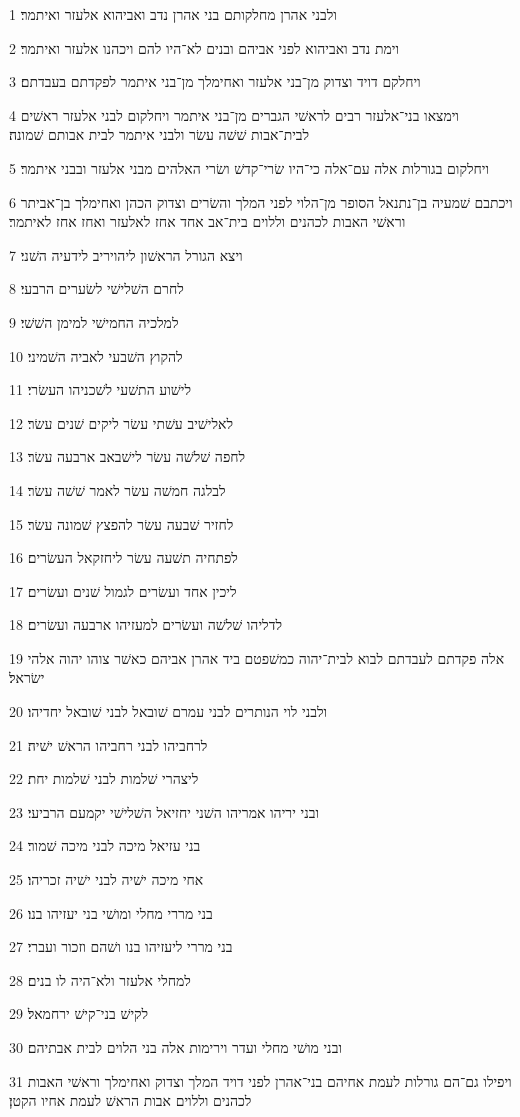 \par 1 ולבני אהרן מחלקותם בני אהרן נדב ואביהוא אלעזר ואיתמר׃
\par 2 וימת נדב ואביהוא לפני אביהם ובנים לא־היו להם ויכהנו אלעזר ואיתמר׃
\par 3 ויחלקם דויד וצדוק מן־בני אלעזר ואחימלך מן־בני איתמר לפקדתם בעבדתם׃
\par 4 וימצאו בני־אלעזר רבים לראשׁי הגברים מן־בני איתמר ויחלקום לבני אלעזר ראשׁים לבית־אבות שׁשׁה עשׂר ולבני איתמר לבית אבותם שׁמונה׃
\par 5 ויחלקום בגורלות אלה עם־אלה כי־היו שׂרי־קדשׁ ושׂרי האלהים מבני אלעזר ובבני איתמר׃
\par 6 ויכתבם שׁמעיה בן־נתנאל הסופר מן־הלוי לפני המלך והשׂרים וצדוק הכהן ואחימלך בן־אביתר וראשׁי האבות לכהנים וללוים בית־אב אחד אחז לאלעזר ואחז אחז לאיתמר׃
\par 7 ויצא הגורל הראשׁון ליהויריב לידעיה השׁני׃
\par 8 לחרם השׁלישׁי לשׂערים הרבעי׃
\par 9 למלכיה החמישׁי למימן השׁשׁי׃
\par 10 להקוץ השׁבעי לאביה השׁמיני׃
\par 11 לישׁוע התשׁעי לשׁכניהו העשׂרי׃
\par 12 לאלישׁיב עשׁתי עשׂר ליקים שׁנים עשׂר׃
\par 13 לחפה שׁלשׁה עשׂר לישׁבאב ארבעה עשׂר׃
\par 14 לבלגה חמשׁה עשׂר לאמר שׁשׁה עשׂר׃
\par 15 לחזיר שׁבעה עשׂר להפצץ שׁמונה עשׂר׃
\par 16 לפתחיה תשׁעה עשׂר ליחזקאל העשׂרים׃
\par 17 ליכין אחד ועשׂרים לגמול שׁנים ועשׂרים׃
\par 18 לדליהו שׁלשׁה ועשׂרים למעזיהו ארבעה ועשׂרים׃
\par 19 אלה פקדתם לעבדתם לבוא לבית־יהוה כמשׁפטם ביד אהרן אביהם כאשׁר צוהו יהוה אלהי ישׂראל׃
\par 20 ולבני לוי הנותרים לבני עמרם שׁובאל לבני שׁובאל יחדיהו׃
\par 21 לרחביהו לבני רחביהו הראשׁ ישׁיה׃
\par 22 ליצהרי שׁלמות לבני שׁלמות יחת׃
\par 23 ובני יריהו אמריהו השׁני יחזיאל השׁלישׁי יקמעם הרביעי׃
\par 24 בני עזיאל מיכה לבני מיכה שׁמור׃
\par 25 אחי מיכה ישׁיה לבני ישׁיה זכריהו׃
\par 26 בני מררי מחלי ומושׁי בני יעזיהו בנו׃
\par 27 בני מררי ליעזיהו בנו ושׁהם וזכור ועברי׃
\par 28 למחלי אלעזר ולא־היה לו בנים׃
\par 29 לקישׁ בני־קישׁ ירחמאל׃
\par 30 ובני מושׁי מחלי ועדר וירימות אלה בני הלוים לבית אבתיהם׃
\par 31 ויפילו גם־הם גורלות לעמת אחיהם בני־אהרן לפני דויד המלך וצדוק ואחימלך וראשׁי האבות לכהנים וללוים אבות הראשׁ לעמת אחיו הקטן׃

